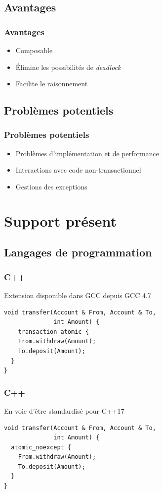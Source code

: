 \documentclass{beamer}
\begin{document}
\subsection{Avantages}
\begin{frame}
\frametitle{Avantages}
\begin{itemize}
\item Composable
\item<2-> Élimine les possibilités de \textit{deadlock}
\item<3-> Facilite le raisonnement
\end{itemize}
\end{frame}

\subsection{Problèmes potentiels}
\begin{frame}
\frametitle{Problèmes potentiels}
\begin{itemize}
\item Problèmes d'implémentation et de performance
\item<2-> Interactions avec code non-transactionnel
\item<3-> Gestions des exceptions
\end{itemize}
\end{frame}

\section{Support présent}
\subsection{Langages de programmation}
\begin{frame}[fragile]
\frametitle{C++}
Extension disponible dans GCC depuis GCC 4.7
\begin{lstlisting}
void transfer(Account & From, Account & To, 
              int Amount) {
  __transaction_atomic {
    From.withdraw(Amount);
    To.deposit(Amount);
  }
}
\end{lstlisting}
\end{frame}

\begin{frame}[fragile]
\frametitle{C++}
En voie d'être standardisé pour C++17
\begin{lstlisting}
void transfer(Account & From, Account & To, 
              int Amount) {
  atomic_noexcept {
    From.withdraw(Amount);
    To.deposit(Amount);
  }
}
\end{lstlisting}
\end{frame}
\end{document}
